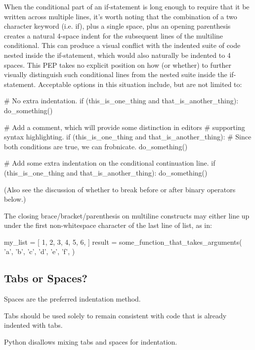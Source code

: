 \documentclass[a4paper,11pt]{article}
\begin{document}
\par
When the conditional part of an if-statement is long enough to require that it
be written across multiple lines, it’s worth noting that the combination of a
two character keyword (i.e. if), plus a single space, plus an opening
parenthesis creates a natural 4-space indent for the subsequent lines of the
multiline conditional. This can produce a visual conflict with the indented
suite of code nested inside the if-statement, which would also naturally be
indented to 4 spaces. This PEP takes no explicit position on how (or whether) to
further visually distinguish such conditional lines from the nested suite inside
the if-statement. Acceptable options in this situation include, but are not
limited to:
\par
\begin{python}
# No extra indentation.
if (this_is_one_thing and
    that_is_another_thing):
    do_something()

# Add a comment, which will provide some distinction in editors
# supporting syntax highlighting.
if (this_is_one_thing and
    that_is_another_thing):
    # Since both conditions are true, we can frobnicate.
    do_something()

# Add some extra indentation on the conditional continuation line.
if (this_is_one_thing
        and that_is_another_thing):
    do_something()
\end{python}
(Also see the discussion of whether to break before or after binary operators
below.)
\par
The closing brace/bracket/parenthesis on multiline constructs may either line up
under the first non-whitespace character of the last line of list, as in:
\par
\begin{python}
my_list = [
    1, 2, 3,
    4, 5, 6,
]
result = some_function_that_takes_arguments(
    'a', 'b', 'c',
    'd', 'e', 'f',
)
\end{python}
\subsection{Tabs or Spaces?}
Spaces are the preferred indentation method.
\par
Tabs should be used solely to remain consistent with code that is already
indented with tabs.
\par
Python disallows mixing tabs and spaces for indentation.
\par
\end{document}
